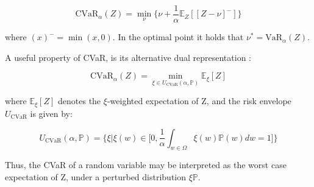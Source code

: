 \begin{equation}
    \text{CVaR}_\alpha (Z) = \underset{\nu} \min \big\{\nu + \frac{1}{\alpha} \mathbb E_Z[[Z- \nu]^-]\big\}
\end{equation}

where $(x)^- = \min(x,0)$. In the optimal point it holds that $\nu^*=\text{VaR}_\alpha(Z)$.

A useful property of CVaR, is its alternative dual representation \cite{Artzner1999}:

\begin{equation}
    \text{CVaR}_\alpha (Z) = \underset{\xi \in U_{\text{CVaR}} (\alpha, \mathbb{P})} \min \mathbb E_\xi[Z]
\end{equation}

where $\mathbb E_\xi[Z]$ denotes the $\xi$-weighted expectation of Z, and the risk envelope $U_\text{CVaR}$ is
given by:

\begin{equation}
    U_{\text{CVaR}}(\alpha, \mathbb{P}) = \Big\{\xi | \xi(w)  \in \big [ 0, \frac{1}{\alpha} \int_{w\in\Omega} \xi(w)\mathbb{P}(w)dw=1   \big ] \Big\}
\end{equation}

Thus, the CVaR of a random variable may be interpreted as the worst case expectation of Z, under
a perturbed distribution $\xi \mathbb{P}$.





